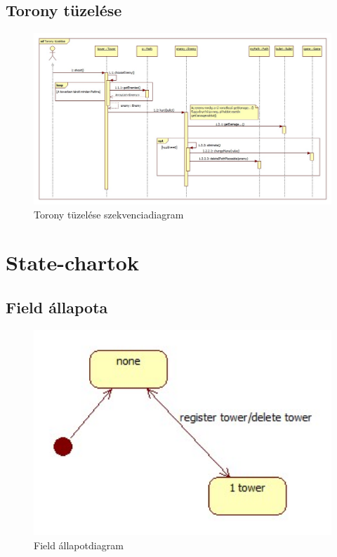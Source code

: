 \subsection{Torony tüzelése}
\begin{figure}[H]
\begin{center}
\includegraphics[width=17cm]{chapters/chapter03/images/Torony_tuzelese.jpg}
\caption{Torony tüzelése szekvenciadiagram}
\label{fig:Torony_tüzelése}
\end{center}
\end{figure}


\section{State-chartok}
\subsection{Field állapota}
\begin{figure}[H]
\begin{center}
\includegraphics[width=17cm]{chapters/chapter03/images/StatechartDiagram_Field.jpg}
\caption{Field állapotdiagram}
\label{fig:Field_állapotdiagram}
\end{center}
\end{figure}

